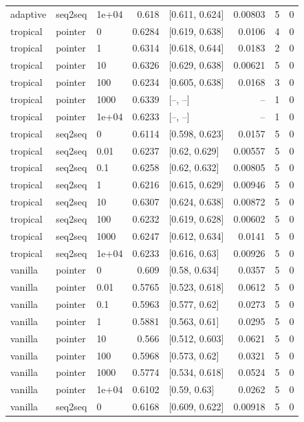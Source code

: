 \documentclass[10pt]{article}
\begin{document}
{\begin{longtable}{lllrlrrr}
adaptive & seq2seq & 1e+04 & 0.618 & [0.611, 0.624] & 0.00803 & 5 & 0\\
tropical & pointer & 0 & 0.6284 & [0.619, 0.638] & 0.0106 & 4 & 0\\
tropical & pointer & 1 & 0.6314 & [0.618, 0.644] & 0.0183 & 2 & 0\\
tropical & pointer & 10 & 0.6326 & [0.629, 0.638] & 0.00621 & 5 & 0\\
tropical & pointer & 100 & 0.6234 & [0.605, 0.638] & 0.0168 & 3 & 0\\
tropical & pointer & 1000 & 0.6339 & [--, --] & -- & 1 & 0\\
tropical & pointer & 1e+04 & 0.6233 & [--, --] & -- & 1 & 0\\
tropical & seq2seq & 0 & 0.6114 & [0.598, 0.623] & 0.0157 & 5 & 0\\
tropical & seq2seq & 0.01 & 0.6237 & [0.62, 0.629] & 0.00557 & 5 & 0\\
tropical & seq2seq & 0.1 & 0.6258 & [0.62, 0.632] & 0.00805 & 5 & 0\\
tropical & seq2seq & 1 & 0.6216 & [0.615, 0.629] & 0.00946 & 5 & 0\\
tropical & seq2seq & 10 & 0.6307 & [0.624, 0.638] & 0.00872 & 5 & 0\\
tropical & seq2seq & 100 & 0.6232 & [0.619, 0.628] & 0.00602 & 5 & 0\\
tropical & seq2seq & 1000 & 0.6247 & [0.612, 0.634] & 0.0141 & 5 & 0\\
tropical & seq2seq & 1e+04 & 0.6233 & [0.616, 0.63] & 0.00926 & 5 & 0\\
vanilla & pointer & 0 & 0.609 & [0.58, 0.634] & 0.0357 & 5 & 0\\
vanilla & pointer & 0.01 & 0.5765 & [0.523, 0.618] & 0.0612 & 5 & 0\\
vanilla & pointer & 0.1 & 0.5963 & [0.577, 0.62] & 0.0273 & 5 & 0\\
vanilla & pointer & 1 & 0.5881 & [0.563, 0.61] & 0.0295 & 5 & 0\\
vanilla & pointer & 10 & 0.566 & [0.512, 0.603] & 0.0621 & 5 & 0\\
vanilla & pointer & 100 & 0.5968 & [0.573, 0.62] & 0.0321 & 5 & 0\\
vanilla & pointer & 1000 & 0.5774 & [0.534, 0.618] & 0.0524 & 5 & 0\\
vanilla & pointer & 1e+04 & 0.6102 & [0.59, 0.63] & 0.0262 & 5 & 0\\
vanilla & seq2seq & 0 & 0.6168 & [0.609, 0.622] & 0.00918 & 5 & 0\\

\end{longtable}}
\end{document}
